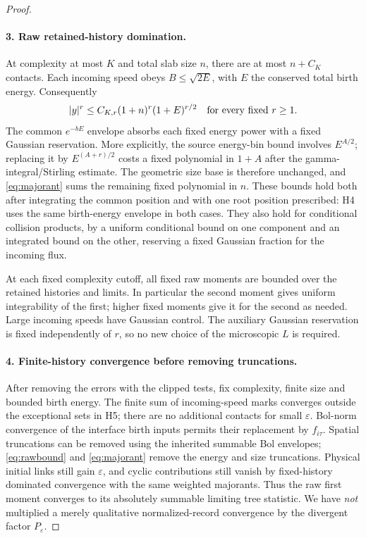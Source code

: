 \documentclass[11pt,letterpaper]{article}
\numberwithin{equation}{section}
\theoremstyle{definition}\newtheorem{assumption}[theorem]{Assumption}
\theoremstyle{remark}\newtheorem{remark}[theorem]{Remark}
\newcommand{\eps}{\varepsilon}\newcommand{\dd}{\,\mathrm d}
\begin{document}
\begin{proof}
\paragraph{3. Raw retained-history domination.}
At complexity at most $K$ and total slab size $n$, there are at most $n+C_K$ contacts. Each incoming speed obeys $B\le\sqrt{2E}$, with $E$ the conserved total birth energy. Consequently
\begin{equation}\label{eq:rawbound}
 |y|^r\le C_{K,r}(1+n)^r(1+E)^{r/2}
 \quad\hbox{for every fixed }r\ge1.
\end{equation}
The common $e^{-bE}$ envelope absorbs each fixed energy power with a fixed Gaussian reservation. More explicitly, the source energy-bin bound involves $E^{A/2}$; replacing it by $E^{(A+r)/2}$ costs a fixed polynomial in $1+A$ after the gamma-integral/Stirling estimate. The geometric size base is therefore unchanged, and \eqref{eq:majorant} sums the remaining fixed polynomial in $n$. These bounds hold both after integrating the common position and with one root position prescribed: H4 uses the same birth-energy envelope in both cases. They also hold for conditional collision products, by a uniform conditional bound on one component and an integrated bound on the other, reserving a fixed Gaussian fraction for the incoming flux.

At each fixed complexity cutoff, all fixed raw moments are bounded over the retained histories and limits. In particular the second moment gives uniform integrability of the first; higher fixed moments give it for the second as needed. Large incoming speeds have Gaussian control. The auxiliary Gaussian reservation is fixed independently of $r$, so no new choice of the microscopic $L$ is required.

\paragraph{4. Finite-history convergence before removing truncations.}
After removing the errors with the clipped tests, fix complexity, finite size and bounded birth energy. The finite sum of incoming-speed marks converges outside the exceptional sets in H5; there are no additional contacts for small $\eps$. Bol-norm convergence of the interface birth inputs permits their replacement by $f_{i\tau}$. Spatial truncations can be removed using the inherited summable Bol envelopes; \eqref{eq:rawbound} and \eqref{eq:majorant} remove the energy and size truncations. Physical initial links still gain $\eps$, and cyclic contributions still vanish by fixed-history dominated convergence with the same weighted majorants. Thus the raw first moment converges to its absolutely summable limiting tree statistic. We have \emph{not} multiplied a merely qualitative normalized-record convergence by the divergent factor $P_\eps$.


\end{proof}
\end{document}
